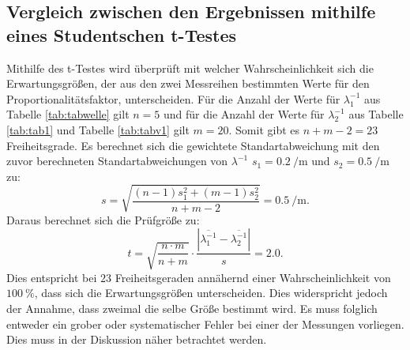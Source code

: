 \subsection{Vergleich zwischen den Ergebnissen mithilfe eines Studentschen t-Testes}
Mithilfe des t-Testes wird überprüft mit welcher Wahrscheinlichkeit sich die Erwartungsgrößen, der aus den zwei Messreihen bestimmten Werte für den Proportionalitätsfaktor, unterscheiden. Für die Anzahl der Werte für $\lambda_1 ^{-1}$ aus Tabelle \ref{tab:tabwelle} gilt $n=5$ und für die Anzahl der Werte für $\lambda_2 ^{-1}$ aus Tabelle \ref{tab:tab1} und Tabelle \ref{tab:tabv1} gilt $m=20$. Somit gibt es $n+m-2=23$ Freiheitsgrade. Es berechnet sich die gewichtete Standartabweichung mit den zuvor berechneten Standartabweichungen von $\lambda ^{-1}$ $s_1 = \SI{0.2}{\per\meter}$ und $s_2 = \SI{0.5}{\per\meter}$ zu:
\begin{displaymath}
	s = \sqrt{\frac{(n-1)s_1^2+(m-1)s_2^2}{n+m-2}} = \SI{0.5}{\per\meter}\text{.}
\end{displaymath}
Daraus berechnet sich die Prüfgröße zu:
\begin{displaymath}
	t = \sqrt{\frac{n \cdot m}{n+m}} \cdot \frac{|\overline{\lambda_1^{-1}} -\overline{\lambda_2^{-1}}|}{s} = \num{2.0}\text{.}
\end{displaymath}
Dies entspricht bei $23$ Freiheitsgeraden annähernd einer Wahrscheinlichkeit von $\SI{100}{\percent}$, dass sich die Erwartungsgrößen unterscheiden. Dies widerspricht jedoch der Annahme, dass zweimal die selbe Größe bestimmt wird. Es muss folglich entweder ein grober oder systematischer Fehler bei einer der Messungen vorliegen. Dies muss in der Diskussion näher betrachtet werden.


